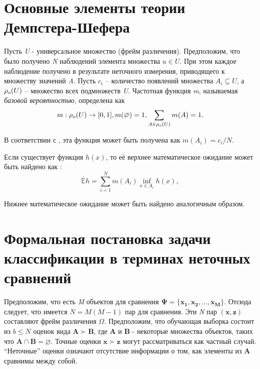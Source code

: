 \documentclass[12pt,a4paper,oneside]{article}
\begin{document}
\begin{multicols}{2}
\vspace*{1em}
\chapter{Основные элементы теории Демпстера-Шефера}

\par
Пусть \emph{U} - универсальное множество (фрейм различения). 
Предположим, что было получено \emph{N} наблюдений элемента множества \(u \in U\).
При этом каждое наблюдение получено в результате неточного измерения, приводящего к множеству значений \emph{A}.
Пусть \(c_i\) -- количество появлений множества \(A_i \subseteq U\), а \(\mathrm{\rho}_o(U)\) -- множество всех подмножеств \emph{U}.
Частотная функция \emph{m}, называемая \emph{базовой вероятностью}, определена как 
\[
m : \mathrm{\rho}_o(U) \to [0,1], 
m(\varnothing) = 1, 
\sum \limits_{A \in \mathrm{\rho}_o(U)} m(A) = 1.
\]

\par
В соответствии с , эта функция может быть получена как \(m(A_i) = c_i / N\).

\par
Если существует функция \(h(x)\), то её верхнее математическое ожидание может быть найдено как :
\[
\mathbb{\overline{E}} h = \sum \limits_{i=1}^N m(A_i) \inf_{x \in A_i} h(x), \]

\par
Нижнее математическое ожидание может быть найдено аналогичным образом. 


\vspace*{1em}
\chapter{Формальная постановка задачи классификации в терминах неточных сравнений}

\par
Предположим, что есть \emph{M} объектов для сравнения \(\mathbf{\Psi} = \{\mathbf{x_1}, \mathbf{x_2}, \dots, \mathbf{x_M}\}\). 
Отсюда следует, что имеется \(N = M(M - 1)\) пар для сравнения. 
Эти \emph{N} пар \((\mathbf{x}, \mathbf{z})\) составляют фрейм различения \(\Omega\). 
Предположим, что обучающая выборка состоит из \(b \leq N\) оценок вида \(\mathbf{A} \succ \mathbf{B}\), где \(\mathbf{A}\) и \(\mathbf{B}\) - некоторые множества объектов, таких что \(\mathbf{A} \cap \mathbf{B} = \varnothing\).  
Точные оценки \(\mathbf{x} \succ \mathbf{z}\) могут рассматриваться как частный случай. ``Неточные'' оценки означают отсутствие информации о том, как элементы из \(\mathbf{A}\) сравнимы между собой. 


\end{multicols}
\end{document}
